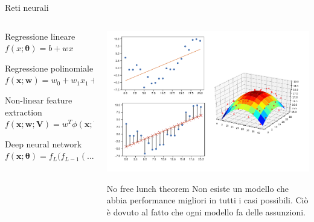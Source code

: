 \documentclass[11pt]{beamer}
\begin{document}
\begin{frame}{Reti neurali \cite{pml1Book,pml2Book,classification_datacamp}}


\begin{columns}
\begin{column}{0.5\textwidth}
\begin{alertblock}{Regressione lineare}
$f(x;\bm{\theta})=b+wx$
\end{alertblock}
\begin{alertblock}{Regressione polinomiale}
$f(\textbf{x};\textbf{w})=w_{0}+w_{1}x_{1}+w_{2}x_{2}+w_{3}x_{1}^{2}+w_{4}x^{2}_{2}$
\end{alertblock}
\begin{alertblock}{Non-linear feature extraction}
$f(\textbf{x};\textbf{w};\textbf{V})=w^{T}\phi(\textbf{x};\textbf{V})$
\end{alertblock}
\begin{alertblock}{Deep neural network}
$f(\textbf{x};\bm{\theta})=f_{L}(f_{L-1}(...(f_{1}(x))...)$
\end{alertblock}
\end{column}
\begin{column}{0.4\textwidth}  
\begin{center}
\includegraphics[width=\textwidth]{Pic/linear_regression.png}
\end{center}
\begin{alertblock}{No free lunch theorem}
Non esiste un modello che abbia performance migliori in tutti i casi possibili. Ciò è dovuto al fatto che ogni modello fa delle assunzioni.
\end{alertblock}
\end{column}
\end{columns}
\end{frame}
\end{document}
